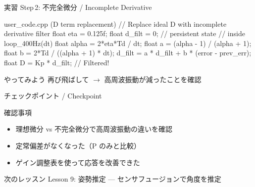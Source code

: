 \begin{frame}[fragile]{実習 Step\,2: 不完全微分 / Incomplete Derivative}
  \begin{sflisting}{user\_code.cpp (D term replacement)}
// Replace ideal D with incomplete derivative filter
float eta = 0.125f;
float d_filt = 0;  // persistent state
// inside loop_400Hz(dt)
float alpha = 2*eta*Td / dt;
float a = (alpha - 1) / (alpha + 1);
float b = 2*Td / ((alpha + 1) * dt);
d_filt = a * d_filt + b * (error - prev_err);
float D = Kp * d_filt;  // Filtered!
  \end{sflisting}

  \begin{exampleblock}{やってみよう}
    再び飛ばして $\to$ 高周波振動が減ったことを確認
  \end{exampleblock}
\end{frame}

\begin{frame}{チェックポイント / Checkpoint}
  \begin{alertblock}{確認事項}
    \begin{itemize}
      \item[$\square$] 理想微分 vs 不完全微分で高周波振動の違いを確認
      \item[$\square$] 定常偏差がなくなった（P のみと比較）
      \item[$\square$] ゲイン調整表を使って応答を改善できた
    \end{itemize}
  \end{alertblock}

  \vspace{1em}

  \begin{block}{次のレッスン}
    Lesson 9: 姿勢推定 --- センサフュージョンで角度を推定
  \end{block}
\end{frame}
